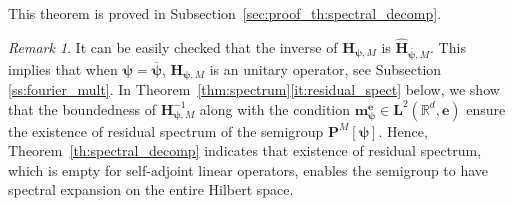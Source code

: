 \documentclass[12pt]{amsart}
\numberwithin{equation}{section}
\newcommand{\bb}{\mathbb}
\newcommand{\cc}{\mathcal}
\newcommand{\ov}{\overline}
\newcommand{\bmrm}[2][2]{\mathbf{#2}^{#1}}
\newcommand{\FsemiM}{\bm{P}^M[\bm{\psi}]}
\newcommand{\HMd}{\bm{H}^{-1}_{\bm{\psi},M}}
\newcommand{\Hpsi}{H_\psi}
\newcommand{\Hpsinv}{H^{-1}_\psi}
\newcommand{\mm}{\mathbf{m}}
\theoremstyle{definition}
\theoremstyle{assump}
\theoremstyle{remark}
\newtheorem{rem}[thm]{Remark}
\begin{document}
	This theorem is proved in Subsection~\ref{sec:proof_th:spectral_decomp}.
	\begin{rem}
		It can be easily checked that the inverse of $\bm{H}_{\bm{\psi},M}$ is $\widehat{\bm{H}}_{\ov{\bm{\psi}},M}$. This implies that when $\bm{\psi}=\ov{\bm{\psi}}$, $\bm{H}_{\bm{\psi},M}$ is an unitary operator, see  Subsection \ref{ss:fourier_mult}. In Theorem~\ref{thm:spectrum}\eqref{it:residual_spect} below, we show that the boundedness of $\HMd$ along with the condition $\mm^{\mathbf e}_{\bm{\psi}}\in\bmrm{L}(\bb{R}^d,\mathbf{e})$ ensure the existence of residual spectrum of the semigroup $\FsemiM$. Hence, Theorem~\ref{th:spectral_decomp} indicates that existence of residual spectrum, which is empty for self-adjoint linear operators, enables the semigroup to have spectral expansion on the entire Hilbert space. %
	\end{rem}

\end{document}
